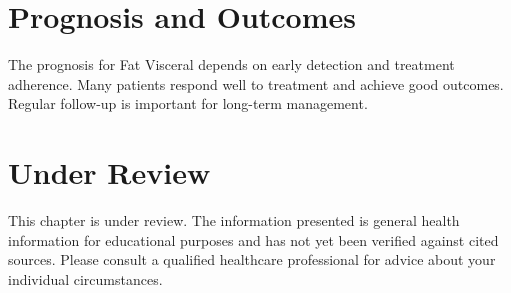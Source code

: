 \section*{Prognosis and Outcomes}
The prognosis for Fat Visceral depends on early detection and treatment adherence. Many patients respond well to treatment and achieve good outcomes. Regular follow-up is important for long-term management.
\section*{Under Review}
This chapter is under review. The information presented is general health information for educational purposes and has not yet been verified against cited sources. Please consult a qualified healthcare professional for advice about your individual circumstances.


\clearpage

